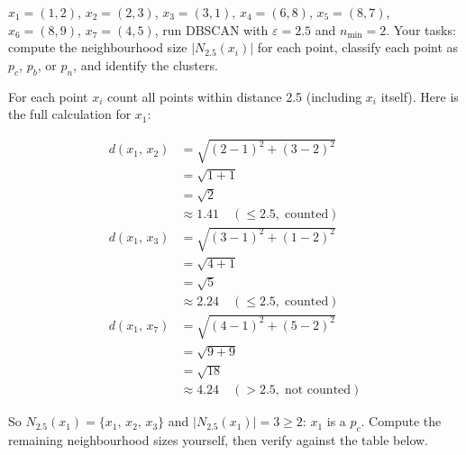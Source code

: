  $x_1{=}(1,2)$, $x_2{=}(2,3)$, $x_3{=}(3,1)$, $x_4{=}(6,8)$, $x_5{=}(8,7)$, $x_6{=}(8,9)$, $x_7{=}(4,5)$, run DBSCAN with $\varepsilon{=}2.5$ and $n_{\min}{=}2$.
Your tasks: compute the neighbourhood size $|N_{2.5}(x_i)|$ for each point, classify each point as $p_c$, $p_b$, or $p_n$, and identify the clusters.

\vspace{0.5em}

 For each point $x_i$ count all points within distance 2.5 (including $x_i$ itself).
Here is the full calculation for $x_1$:

\begin{align*}
    d(x_1,\,x_2) &= \sqrt{(2-1)^2 + (3-2)^2} \\
                 &= \sqrt{1 + 1} \\
                 &= \sqrt{2} \\
                 &\approx 1.41 \quad (\leq 2.5,\; \text{counted}) \\[4pt]
    d(x_1,\,x_3) &= \sqrt{(3-1)^2 + (1-2)^2} \\
                 &= \sqrt{4 + 1} \\
                 &= \sqrt{5} \\
                 &\approx 2.24 \quad (\leq 2.5,\; \text{counted}) \\[4pt]
    d(x_1,\,x_7) &= \sqrt{(4-1)^2 + (5-2)^2} \\
                 &= \sqrt{9 + 9} \\
                 &= \sqrt{18} \\
                 &\approx 4.24 \quad (> 2.5,\; \text{not counted})
\end{align*}

So $N_{2.5}(x_1) = \{x_1,\, x_2,\, x_3\}$ and $|N_{2.5}(x_1)| = 3 \geq 2$: $x_1$ is a $p_c$.
Compute the remaining neighbourhood sizes yourself, then verify against the table below.

